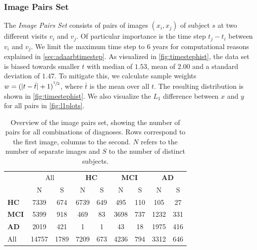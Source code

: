 \subsubsection*{Image Pairs Set} \label{sec:datpairs}
The \textit{Image Pairs Set} consists of pairs of images $(x_i, x_j)$ of subject $s$ at two different visits $v_i$ and $v_j$. Of particular importance is the time step $t_j - t_i$ between $v_i$ and $v_j$. We limit the maximum time step to 6 years for computational reasons explained in \autoref{sec:adaarbtimestep}. As visualized in \autoref{fig:timestephist}, the data set is biased towards smaller $t$ with median of $1.53$, mean of $2.00$ and a standard deviation of $1.47$. To mitigate this, we calculate sample weights $w = {(| t - \bar t | + 1)}^{\sfrac{1}{2}}$, where $\bar t$ is the mean over all $t$. The resulting distribution is shown in \autoref{fig:timestephist}. We also visualize the $L_1$ difference between $x$ and $y$ for all pairs in \autoref{fig:l1plots}.

\begin{table}[p]
	\begin{center}
		\begin{tabular}{l c c | c c c c c c}
			\toprule
			& 
			\multicolumn{2}{c}{All} &
			\multicolumn{2}{c}{\bfseries HC} & 
			\multicolumn{2}{c}{\bfseries MCI} & 
			\multicolumn{2}{c}{\bfseries AD} \\
			\cmidrule(lr){2-3}
			\cmidrule(lr){4-5}
			\cmidrule(lr){6-7}
			\cmidrule(lr){8-9}
			& N & \multicolumn{1}{c}{S} & N & S & N & S & N & S \\ 
			\cmidrule(lr){1-9}
			\bfseries HC  &  7339 &  674 & 6739 & 649 &  495 & 110 &  105 &  27 \\
			\bfseries MCI &  5399 &  918 &  469 &  83 & 3698 & 737 & 1232 & 331 \\
			\bfseries AD  &  2019 &  421 &    1 &   1 &   43 &  18 & 1975 & 416 \\
			\cmidrule(lr){1-9}
			All           & 14757 & 1789 & 7209 & 673 & 4236 & 794 & 3312 & 646 \\
			\bottomrule
		\end{tabular}
		\caption{Overview of the image pairs set, showing the number of pairs for all combinations of diagnoses. Rows correspond to the first image, columns to the second. $N$ refers to the number of separate images and $S$ to the number of distinct subjects.}
		\label{tab:pairsset}
	\end{center}
\end{table}

